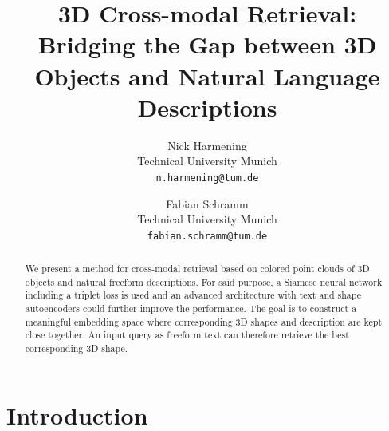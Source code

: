 \documentclass[10pt,twocolumn,letterpaper]{article}
\begin{document}
\title{3D Cross-modal Retrieval: Bridging the Gap between 3D Objects and Natural Language Descriptions}

\author{Nick Harmening\\
Technical University Munich\\
{\tt\small n.harmening@tum.de}
\and
Fabian Schramm\\
Technical University Munich\\
{\tt\small fabian.schramm@tum.de}
}

\maketitle

\begin{abstract}
   We present a method for cross-modal retrieval based on colored point clouds of 3D objects and natural freeform descriptions. For said purpose, a Siamese neural network including a triplet loss is used and an advanced architecture with text and shape autoencoders could further improve the performance. The goal is to construct a meaningful embedding space where corresponding 3D shapes and description are kept close together. An input query as freeform text can therefore retrieve the best corresponding 3D shape.
\end{abstract}

\section{Introduction}
\end{document}
